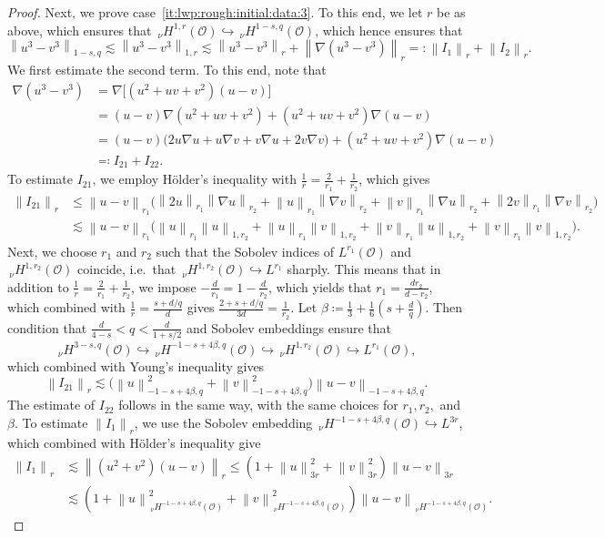 \documentclass[reqno]{amsart}
\newcommand{\sO}{\mathscr{O}}
\newcommand{\ce}{\coloneqq}
\newcommand{\1}{\mathbf{1}}
\newcommand{\nH}{\ensuremath{\,_\nu H}}
\newcommand{\bpsn}[1]{\ensuremath{\nH^{#1}(\sO)}}
\newcommand{\nrm}[1]{\left\lVert #1 \right\rVert}
\begin{document}
\begin{proof}
        Next, we prove case~\ref{it:lwp:rough:initial:data:3}. To this end, we let $r$ be as above, which ensures that $\bpsn{1,r}\hookrightarrow\bpsn{1-s,q} $, which hence ensures that 
        $$ \nrm{ u^3-v^3}_{1-s,q}\lesssim \nrm{u^3-v^3}_{1,r}\lesssim \nrm{u^3-v^3}_r+\nrm{\nabla(u^3-v^3)}_r=:\nrm{I_1}_r+\nrm{I_2}_{r}.$$
        We first estimate the second term. To this end, note that 
        $$\begin{aligned}
            \nabla (u^3-v^3)&= \nabla\big[(u^2+uv+v^2)(u-v)\big]\\
            &=(u-v)\nabla(u^2+uv+v^2) + (u^2+uv+v^2)\nabla(u-v)\\
            &=(u-v)\big( 2u\nabla u + u\nabla v +v\nabla u +2v \nabla v \big) + (u^2+uv+v^2)\nabla (u-v)\\
            &\eqqcolon I_{21}+I_{22}.
        \end{aligned}$$
        To estimate $I_{21}$, we employ Hölder's inequality with $\frac1r=\frac{2}{r_1}+\frac{1}{r_2}$, which gives 
        \[\begin{aligned}
            \nrm{I_{21}}_{r}&\le \nrm{u-v}_{r_1}\big(\nrm{2u}_{r_1}\nrm{\nabla u}_{r_2}+ \nrm{u}_{r_1}\nrm{\nabla v}_{r_2}+ \nrm{v}_{r_1}\nrm{\nabla u}_{r_2}+ \nrm{2v}_{r_1}\nrm{\nabla v}_{r_2}\big)\\
            &\lesssim \nrm{u-v}_{r_1}\big(\nrm{u}_{r_1}\nrm{u}_{1,r_2}+ \nrm{u}_{r_1}\nrm{ v}_{1,r_2}+ \nrm{v}_{r_1}\nrm{ u}_{1,r_2}+ \nrm{v}_{r_1}\nrm{ v}_{1,r_2}\big).
        \end{aligned}\]
        Next, we choose $r_1$ and $r_2$ such that the Sobolev indices of $L^{r_1}(\sO)$ and $\bpsn{1,r_2}$ coincide, i.e.\ that $\bpsn{1,r_2} \hookrightarrow L^{r_1}$ sharply. This means that in addition to $\frac{1}{r}=\frac{2}{r_1}+\frac{1}{r_2}$, we impose $-\frac{d}{r_1}=1-\frac{d}{r_2}$, which yields that $r_1=\frac{dr_2}{d-r_2}$, which combined with $\frac{1}{r}=\frac{s+d/q}{d}$  gives $\frac{2+s+d/q}{3d}=\frac{1}{r_2}$.
        Let $\beta\ce \frac{1}{3}+\frac16(s+\frac{d}{q})$. 
        Then condition that $\frac{d}{4-s}<q< \frac{d}{1+s/2}$ and Sobolev embeddings ensure that 
        \begin{equation*} \bpsn{3-s,q}\hookrightarrow\bpsn{-1-s+4\beta,q}\hookrightarrow \bpsn{1,r_2}\hookrightarrow L^{r_1}(\sO),
        \end{equation*}
        which combined with Young's inequality gives 
        $$\nrm{I_{21}}_{r} \lesssim \big(\nrm{u}_{-1-s+4\beta,q}^2+\nrm{v}_{-1-s+4\beta,q}^2\big)\nrm{u-v}_{-1-s+4\beta,q}.$$
        The estimate of $I_{22}$ follows in the same way, with the same choices for $r_1, r_2, $ and $\beta$. 
        To estimate $\nrm{I_1}_r$, we use the Sobolev embedding $\bpsn{-1-s+4\beta,q}\hookrightarrow L^{3r}$, which combined with Hölder's inequality give 
        \[\begin{aligned}
            \nrm{I_1}_r&\lesssim \nrm{(u^2+v^2)(u-v)}_r \le (1+\nrm{u}_{3r}^2+\nrm{v}_{3r}^2)\nrm{u-v}_{3r}\\
            &\lesssim (1+\nrm{u}^2_{\bpsn{-1-s+4\beta,q}}+\nrm{v}^2_{\bpsn{-1-s+4\beta,q}})\nrm{u-v}_{\bpsn{-1-s+4\beta,q}}.
        \end{aligned}\]
         


\end{proof}
\end{document}
